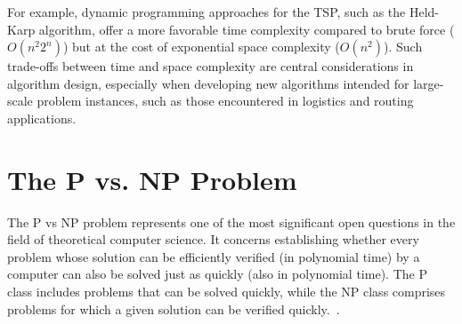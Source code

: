 For example, dynamic programming approaches for the \Gls{TSP}, such as the Held-Karp algorithm, offer a more favorable time complexity compared to brute force (\(O(n^2 2^n)\)) but at the cost of exponential space complexity (\(O(n^2)\)). Such trade-offs between time and space complexity are central considerations in algorithm design, especially when developing new algorithms intended for large-scale problem instances, such as those encountered in logistics and routing applications.

\section{The \Gls{P} vs. \Gls{NP} Problem}

The \Gls{P} vs \Gls{NP} problem represents one of the most significant open questions in the field of theoretical computer science. It concerns establishing whether every problem whose solution can be efficiently verified (in polynomial time) by a computer can also be solved just as quickly (also in polynomial time). The \Gls{P} class includes problems that can be solved quickly, while the \Gls{NP} class comprises problems for which a given solution can be verified quickly.~\cite{PvsNP}.
